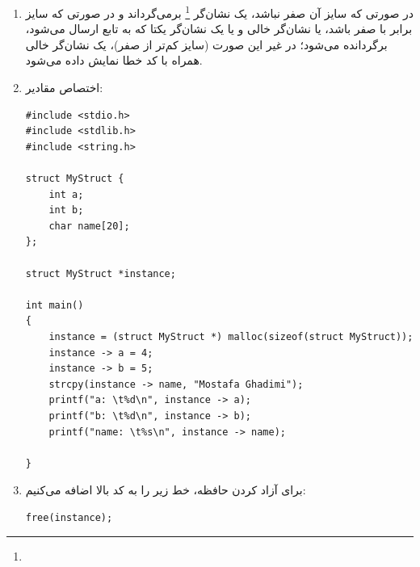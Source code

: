
\begin{enumerate}
	\item در صورتی که سایز آن صفر نباشد، یک نشان‌گر \footnote{} برمی‌گرداند و در صورتی که سایز برابر با صفر باشد، یا نشان‌گر خالی و یا یک نشان‌گر یکتا که به تابع   ارسال می‌شود، برگردانده می‌شود؛ در غیر این صورت (سایز کم‌تر از صفر)، یک نشان‌گر خالی همراه با کد خطا نمایش داده می‌شود.
	\item اختصاص مقادیر:
	
	\begin{Verbatim}[tabsize=4]
#include <stdio.h>
#include <stdlib.h>
#include <string.h>

struct MyStruct {
	int a;
	int b;
	char name[20];
};

struct MyStruct *instance;

int main()
{
	instance = (struct MyStruct *) malloc(sizeof(struct MyStruct));
	instance -> a = 4;
	instance -> b = 5;
	strcpy(instance -> name, "Mostafa Ghadimi");
	printf("a: \t%d\n", instance -> a);
	printf("b: \t%d\n", instance -> b);
	printf("name: \t%s\n", instance -> name);

}
	\end{Verbatim}
	
	\item برای آزاد کردن حافظه، خط زیر را به کد بالا اضافه می‌کنیم:

	\begin{Verbatim}[tabsize=4]
free(instance);	
	\end{Verbatim}
\end{enumerate}
\newpage
{}
